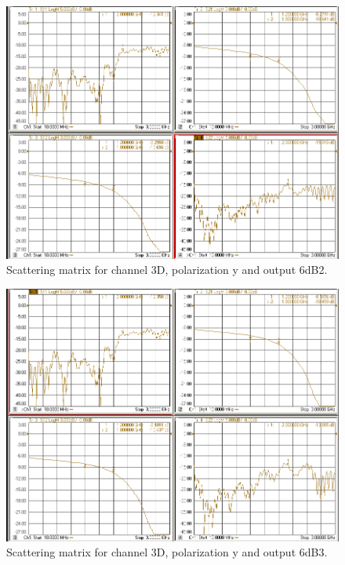 \documentclass[12pt,a4paper,oneside]{article}
\begin{document}
\begin{figure}[H]
\centering
\includegraphics[width=0.9\linewidth]{VNA_results/3Dy_6dB2.png}
\caption{Scattering matrix for channel 3D, polarization y and output 6dB2.}
\label{fig:3Dy_6dB2}
\end{figure}


\begin{figure}[H]
\centering
\includegraphics[width=0.9\linewidth]{VNA_results/3Dy_6dB3.png}
\caption{Scattering matrix for channel 3D, polarization y and output 6dB3.}
\label{fig:3Dy_6dB3}
\end{figure}
\end{document}
